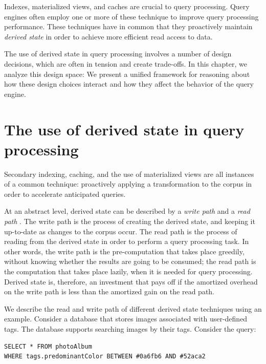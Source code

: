 Indexes, materialized views, and caches are crucial to query processing.
Query engines often employ one or more of these technique to improve query processing performance.
These techniques have in common that they proactively maintain \textit{derived state} in order to achieve more efficient read
access to data.

The use of derived state in query processing involves a number of design decisions,
which are often in tension and create trade-offs.
In this chapter, we analyze this design space:
We present a unified framework for reasoning about how these design choices interact
and how they affect the behavior of the query engine.


\section{The use of derived state in query processing}
\label{sec:read_write_path}

Secondary indexing, caching, and the use of materialized views are all instances of a common technique:
proactively applying a transformation to the corpus in order to accelerate anticipated queries.

At an abstract level, derived state can be described by a \textit{write path} and a \textit{read path}
\cite{kleppmann:designing}.
The write path is the process of creating the derived state, and keeping it up-to-date as changes to the corpus occur.
The read path is the process of reading from the derived state in order to perform a query processing task.
In other words, the write path is the pre-computation that takes place greedily, without knowing whether the results are going to be consumed;
the read path is the computation that takes place lazily, when it is needed for query processing.
Derived state is, therefore, an investment that pays off if the amortized overhead on the write path is less than the amortized gain
on the read path.

We describe the read and write path of different derived state techniques using an example.
Consider a database that stores images associated with user-defined tags.
The database supports searching images by their tags.
Consider the query:

\begin{lstlisting}[]
SELECT * FROM photoAlbum
WHERE tags.predominantColor BETWEEN #0a6fb6 AND #52aca2
\end{lstlisting}


